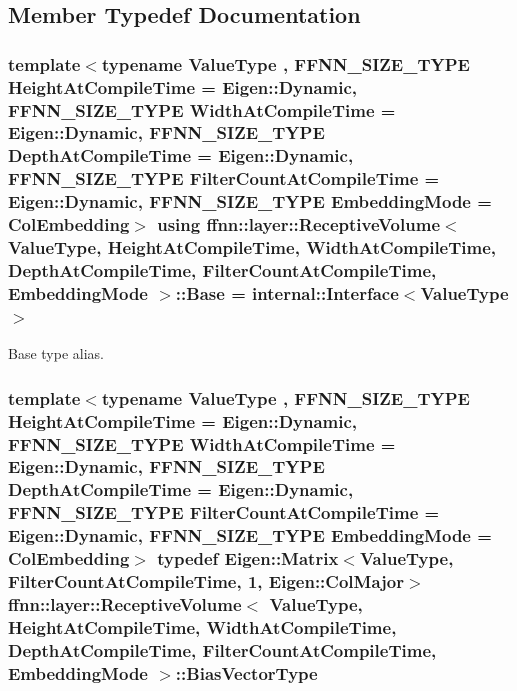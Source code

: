 \subsection{Member Typedef Documentation}
\hypertarget{classffnn_1_1layer_1_1_receptive_volume_a99a6c14984f9d1cc731f1b1b6e00fb2c}{
\subsubsection[{Base}]{\setlength{\rightskip}{0pt plus 5cm}template$<$typename Value\-Type , F\-F\-N\-N\-\_\-\-S\-I\-Z\-E\-\_\-\-T\-Y\-P\-E Height\-At\-Compile\-Time = Eigen\-::\-Dynamic, F\-F\-N\-N\-\_\-\-S\-I\-Z\-E\-\_\-\-T\-Y\-P\-E Width\-At\-Compile\-Time = Eigen\-::\-Dynamic, F\-F\-N\-N\-\_\-\-S\-I\-Z\-E\-\_\-\-T\-Y\-P\-E Depth\-At\-Compile\-Time = Eigen\-::\-Dynamic, F\-F\-N\-N\-\_\-\-S\-I\-Z\-E\-\_\-\-T\-Y\-P\-E Filter\-Count\-At\-Compile\-Time = Eigen\-::\-Dynamic, F\-F\-N\-N\-\_\-\-S\-I\-Z\-E\-\_\-\-T\-Y\-P\-E Embedding\-Mode = Col\-Embedding$>$ using {\bf ffnn\-::layer\-::\-Receptive\-Volume}$<$ Value\-Type, Height\-At\-Compile\-Time, Width\-At\-Compile\-Time, Depth\-At\-Compile\-Time, Filter\-Count\-At\-Compile\-Time, {\bf Embedding\-Mode} $>$\-::{\bf Base} =  {\bf internal\-::\-Interface}$<$Value\-Type$>$}}\label{classffnn_1_1layer_1_1_receptive_volume_a99a6c14984f9d1cc731f1b1b6e00fb2c}


Base type alias. 

\hypertarget{classffnn_1_1layer_1_1_receptive_volume_a22ec68a5323233ca8bbcacc2b7387dbb}{
\subsubsection[{Bias\-Vector\-Type}]{\setlength{\rightskip}{0pt plus 5cm}template$<$typename Value\-Type , F\-F\-N\-N\-\_\-\-S\-I\-Z\-E\-\_\-\-T\-Y\-P\-E Height\-At\-Compile\-Time = Eigen\-::\-Dynamic, F\-F\-N\-N\-\_\-\-S\-I\-Z\-E\-\_\-\-T\-Y\-P\-E Width\-At\-Compile\-Time = Eigen\-::\-Dynamic, F\-F\-N\-N\-\_\-\-S\-I\-Z\-E\-\_\-\-T\-Y\-P\-E Depth\-At\-Compile\-Time = Eigen\-::\-Dynamic, F\-F\-N\-N\-\_\-\-S\-I\-Z\-E\-\_\-\-T\-Y\-P\-E Filter\-Count\-At\-Compile\-Time = Eigen\-::\-Dynamic, F\-F\-N\-N\-\_\-\-S\-I\-Z\-E\-\_\-\-T\-Y\-P\-E Embedding\-Mode = Col\-Embedding$>$ typedef Eigen\-::\-Matrix$<$Value\-Type, Filter\-Count\-At\-Compile\-Time, 1, Eigen\-::\-Col\-Major$>$ {\bf ffnn\-::layer\-::\-Receptive\-Volume}$<$ Value\-Type, Height\-At\-Compile\-Time, Width\-At\-Compile\-Time, Depth\-At\-Compile\-Time, Filter\-Count\-At\-Compile\-Time, {\bf Embedding\-Mode} $>$\-::{\bf Bias\-Vector\-Type}}}\label{classffnn_1_1layer_1_1_receptive_volume_a22ec68a5323233ca8bbcacc2b7387dbb}


